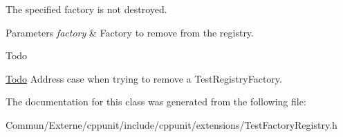 The specified factory is not destroyed. 
\begin{DoxyParams}{Parameters}
{\em factory} & Factory to remove from the registry. \\
\hline
\end{DoxyParams}
\begin{DoxyRefDesc}{Todo}
\item[\hyperlink{todo__todo000001}{Todo}]Address case when trying to remove a Test\+Registry\+Factory. \end{DoxyRefDesc}


The documentation for this class was generated from the following file\+:\begin{DoxyCompactItemize}
\item 
Commun/\+Externe/cppunit/include/cppunit/extensions/Test\+Factory\+Registry.\+h\end{DoxyCompactItemize}
